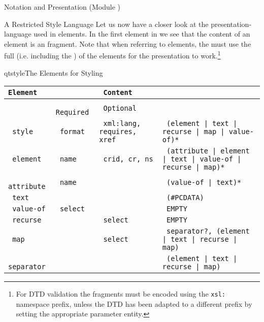 \begin{tchapter}[id=pres,short=Notation and Presentation]{Notation and Presentation (Module {})}
\begin{tsection}[id=style]{A Restricted Style Language}
  Let us now have a closer look at the presentation-language used in {}
  elements.  In the first {} element in {} we see that
  the content of an {} element is an {\xslt} fragment.  Note that when
  referring to {\omdoc} elements, the {\xslt} must use the full
  {} (i.e. including the {}) of the elements
  for the presentation to work.\footnote{For DTD validation the {\xslt} fragments must be
    encoded using the {\tt{xsl:}} namespace prefix, unless the DTD has been adapted to a
    different prefix by setting the appropriate parameter entity.}
\begin{myfig}{qtstyle}{The {\omdoc} Elements for Styling}
\begin{scriptsize}
\begin{tabular}{|>{\tt}l|>{\tt}l|>{\tt}p{}|>{\tt}p{}|}\hline
{\rm Element}& \multicolumn{2}{l|}{Attributes\hspace*{2.25cm}} & Content  \\\hline
             & {\rm Required}  & {\rm Optional}     &           \\\hline\hline
 style      & format  & xml:lang, requires, xref & (element | text | recurse | map | value-of)*\\\hline 
 element    & name    & crid, cr, ns       & (attribute | element | text | 
                                              value-of  | recurse | map)*\\\hline
 attribute  & name    &                    & (value-of | text)*\\\hline
 text       &         &                    & (\#PCDATA)\\\hline
 value-of   & select  &                    & EMPTY\\\hline
 recurse    &         & select             & EMPTY\\\hline
 map        &         & select             & separator?, (element | text | recurse | map)\\\hline
 separator  &         &                    & (element | text | recurse | map)\\\hline
\end{tabular}
\end{scriptsize}
\end{myfig}
  

\end{tsection}
\end{tchapter}

